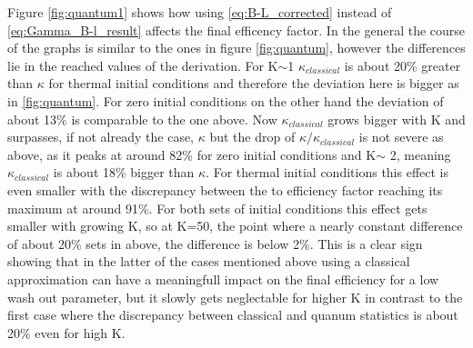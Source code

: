 Figure \ref{fig:quantum1} shows how using \eqref{eq:B-L_corrected} instead of \eqref{eq:Gamma_B-l_result} affects the final efficency factor. In the general the course of the graphs is similar to the ones in figure \ref{fig:quantum}, however the differences lie in the reached values of the derivation. For K$\sim$1 $\kappa_{classical}$ is about 20\% greater than $\kappa$ for thermal initial conditions and therefore the deviation here is bigger as in \ref{fig:quantum}. For zero initial conditions on the other hand the deviation of about 13\% is comparable to the one above. Now $\kappa_{classical}$ grows bigger with K and surpasses, if not already the case, $\kappa$ but the drop of $\kappa/\kappa_{classical}$ is not severe as above, as it peaks at around 82\% for zero initial conditions and K$\sim$ 2, meaning $\kappa_{classical}$ is about 18\% bigger than $\kappa$. For thermal initial conditions this effect is even smaller with the discrepancy between the to efficiency factor reaching its maximum at around 91\%. For both sets of initial conditions this effect gets smaller with growing K, so at K=50, the point where a nearly constant difference of about 20\% sets in above, the difference is below 2\%. \newline \indent
This is a clear sign showing that in the latter of the cases mentioned above using a classical approximation can have a meaningfull impact on the final efficiency for a low wash out parameter, but it slowly gets neglectable for higher K in contrast to the first case where the discrepancy between classical and quanum statistics is about 20\% even for high K.